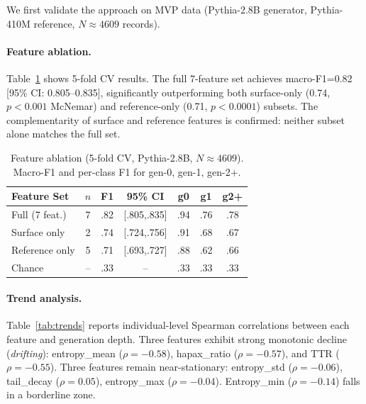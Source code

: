 \documentclass[11pt,a4paper]{article}
\begin{document}
We first validate the approach on MVP data (Pythia-2.8B generator, Pythia-410M reference, $N{\approx}4609$ records).

\paragraph{Feature ablation.} Table~\ref{tab:ablation} shows 5-fold CV results. The full 7-feature set achieves macro-F1=0.82 [95\% CI: 0.805--0.835], significantly outperforming both surface-only (0.74, $p{<}0.001$ McNemar) and reference-only (0.71, $p{<}0.0001$) subsets. The complementarity of surface and reference features is confirmed: neither subset alone matches the full set.

\begin{table}[t]
\centering
\small
\begin{tabular}{lcccccc}
\toprule
Feature Set & $n$ & F1 & 95\% CI & g0 & g1 & g2+ \\
\midrule
Full (7 feat.) & 7 & .82 & [.805,.835] & .94 & .76 & .78 \\
Surface only & 2 & .74 & [.724,.756] & .91 & .68 & .67 \\
Reference only & 5 & .71 & [.693,.727] & .88 & .62 & .66 \\
Chance & -- & .33 & -- & .33 & .33 & .33 \\
\bottomrule
\end{tabular}
\caption{Feature ablation (5-fold CV, Pythia-2.8B, $N{\approx}4609$). Macro-F1 and per-class F1 for gen-0, gen-1, gen-2+.}
\label{tab:ablation}
\end{table}

\paragraph{Trend analysis.} Table~\ref{tab:trends} reports individual-level Spearman correlations between each feature and generation depth. Three features exhibit strong monotonic decline (\emph{drifting}): entropy\_mean ($\rho{=}{-}0.58$), hapax\_ratio ($\rho{=}{-}0.57$), and TTR ($\rho{=}{-}0.55$). Three features remain near-stationary: entropy\_std ($\rho{=}{-}0.06$), tail\_decay ($\rho{=}0.05$), entropy\_max ($\rho{=}{-}0.04$). Entropy\_min ($\rho{=}{-}0.14$) falls in a borderline zone.
\end{document}
